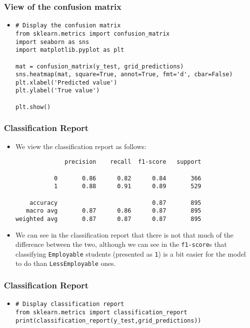 \begin{frame}[fragile]
\frametitle{View of the confusion matrix}
	\begin{itemize}
		\item[] \begin{verbatim}
# Display the confusion matrix
from sklearn.metrics import confusion_matrix
import seaborn as sns
import matplotlib.pyplot as plt

mat = confusion_matrix(y_test, grid_predictions)
sns.heatmap(mat, square=True, annot=True, fmt='d', cbar=False)
plt.xlabel('Predicted value')
plt.ylabel('True value')

plt.show()
\end{verbatim}
	\end{itemize}
\end{frame}

\begin{frame}[fragile]
\frametitle{Classification Report}
	\begin{itemize}
		\item We view the classification report as follows:
\begin{verbatim}
              precision    recall  f1-score   support

           0       0.86      0.82      0.84       366
           1       0.88      0.91      0.89       529

    accuracy                           0.87       895
   macro avg       0.87      0.86      0.87       895
weighted avg       0.87      0.87      0.87       895
\end{verbatim}
		\item We can see in the classification report that there is not that much of the difference between the two, although we can see in the \texttt{f1-score}s that classifying \texttt{Employable} students (presented as \texttt{1}) is a bit easier for the model to do than \texttt{LessEmployable} ones.
	\end{itemize}
\end{frame}

\begin{frame}[fragile]
\frametitle{Classification Report}
	\begin{itemize}
	\item[] \begin{verbatim}
# Display classification report
from sklearn.metrics import classification_report
print(classification_report(y_test,grid_predictions))
\end{verbatim}
	\end{itemize}
\end{frame}
